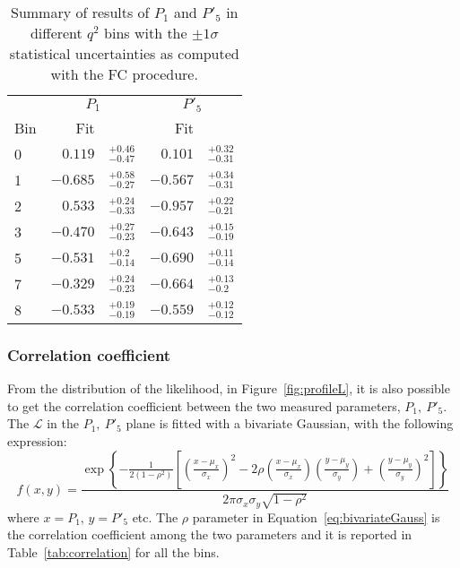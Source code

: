 \begin{table*}[!htb]

  \begin{center}
    \caption{Summary of results of $P_1$ and $P'_5$ in different $q^2$ bins with the $\pm1\sigma$ statistical uncertainties as computed with the FC procedure.}\label{tab:FC}

    \begin{tabular}{l|rl|rl}
      & \multicolumn{2}{c|}{$P_1$} &  \multicolumn{2}{c}{$P'_5$} \\ 
      Bin  & Fit & & Fit &   \\ 
      \hline
      0 &  $0.119 $  &$^{+ 0.46}_{- 0.47}$ & $0.101$  & $^{+ 0.32}_{- 0.31}$ \\
      1 &  $-0.685$ &$^{+ 0.58}_{- 0.27}$  & $-0.567$ & $^{+ 0.34}_{- 0.31}$ \\
      2 &  $0.533 $  &$^{+ 0.24}_{- 0.33}$ & $-0.957$ & $^{+ 0.22}_{- 0.21}$ \\
      3 &  $-0.470$ &$^{+ 0.27}_{- 0.23}$  & $-0.643$ & $^{+ 0.15}_{- 0.19}$ \\
      5 &  $-0.531$ &$^{+ 0.2}_{- 0.14} $  & $-0.690$ & $^{+ 0.11}_{- 0.14}$ \\
      7 &  $-0.329$ &$^{+ 0.24}_{- 0.23}$  & $-0.664$ & $^{+ 0.13}_{- 0.2}$ \\
      8 &  $-0.533$ &$^{+ 0.19}_{- 0.19}$  & $-0.559$ & $^{+ 0.12}_{- 0.12}$ \\
      \hline                                                  

    \end{tabular}
  \end{center}
\end{table*}

\clearpage
\subsubsection{Correlation coefficient}

From the distribution of the likelihood, in Figure~\ref{fig:profileL}, it is also possible to get the correlation coefficient between the two measured parameters, $P_1,~P'_5$.
The $\mathcal{L}$ in the $P_1,~P'_5$ plane is fitted with a bivariate Gaussian, with the following expression:
\begin{equation}\label{eq:bivariateGauss}
  f(x,y)=\frac{\exp \left\{ -\frac 1{2(1-\rho ^2)}\left[ \left( \frac{x-\mu _x}{\sigma _x}\right) ^2-2\rho \left( \frac{x-\mu _x}{\sigma _x}\right) \left(\frac{y-\mu _y}{\sigma _y}\right) +\left( \frac{y-\mu _y}{\sigma _y}\right)^2\right] \right\} }{2\pi \sigma _x\sigma _y\sqrt{1-\rho ^2}} 
\end{equation}
where $x=P_1$, $y=P'_5$ etc. The $\rho$ parameter in Equation~\ref{eq:bivariateGauss} is the correlation coefficient among the two parameters and it is reported in Table~\ref{tab:correlation} for all the bins.

